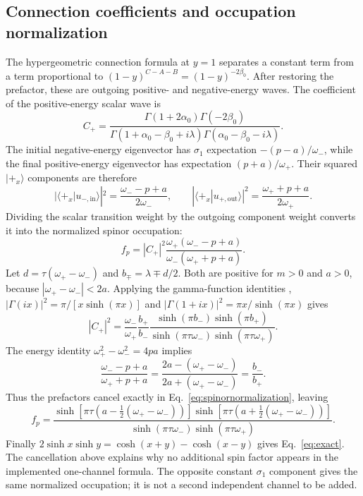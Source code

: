 \documentclass[11pt,a4paper]{article}
\begin{document}
\subsection{Connection coefficients and occupation normalization}
The hypergeometric connection formula \cite[Eq.~15.10.21]{DLMF} at $y=1$ separates a constant term from a term proportional to $(1-y)^{C-A-B}=(1-y)^{-2\beta_0}$. After restoring the prefactor, these are outgoing positive- and negative-energy waves. The coefficient of the positive-energy scalar wave is
\begin{equation}
 C_+=\frac{\Gamma(1+2\alpha_0)\Gamma(-2\beta_0)}
 {\Gamma(1+\alpha_0-\beta_0+i\lambda)\Gamma(\alpha_0-\beta_0-i\lambda)}.
 \label{eq:connection}
\end{equation}
The initial negative-energy eigenvector has $\sigma_1$ expectation $-(p-a)/\omega_-$, while the final positive-energy eigenvector has expectation $(p+a)/\omega_+$. Their squared $|+_x\rangle$ components are therefore
\begin{equation}
 |\langle+_x|u_{-,\mathrm{in}}\rangle|^2=\frac{\omega_--p+a}{2\omega_-},\qquad
 |\langle+_x|u_{+,\mathrm{out}}\rangle|^2=\frac{\omega_++p+a}{2\omega_+}.
\end{equation}
Dividing the scalar transition weight by the outgoing component weight converts it into the normalized spinor occupation:
\begin{equation}
 f_p=|C_+|^2\frac{\omega_+(\omega_--p+a)}{\omega_-(\omega_++p+a)}.
 \label{eq:spinornormalization}
\end{equation}
Let $d=\tau(\omega_+-\omega_-)$ and $b_\mp=\lambda\mp d/2$. Both are positive for $m>0$ and $a>0$, because $|\omega_+-\omega_-|<2a$. Applying the gamma-function identities \cite[Eqs.~5.4.3 and~5.5.1]{DLMF}, $|\Gamma(ix)|^2=\pi/[x\sinh(\pi x)]$ and $|\Gamma(1+ix)|^2=\pi x/\sinh(\pi x)$ gives
\begin{equation}
 |C_+|^2=\frac{\omega_-}{\omega_+}\frac{b_+}{b_-}
 \frac{\sinh(\pi b_-)\sinh(\pi b_+)}
 {\sinh(\pi\tau\omega_-)\sinh(\pi\tau\omega_+)}.
\end{equation}
The energy identity $\omega_+^2-\omega_-^2=4pa$ implies
\begin{equation}
 \frac{\omega_--p+a}{\omega_++p+a}
 =\frac{2a-(\omega_+-\omega_-)}{2a+(\omega_+-\omega_-)}
 =\frac{b_-}{b_+}.
\end{equation}
Thus the prefactors cancel exactly in Eq.~\eqref{eq:spinornormalization}, leaving
\begin{equation}
 f_p=\frac{\sinh[\pi\tau(a-\tfrac12(\omega_+-\omega_-))]
             \sinh[\pi\tau(a+\tfrac12(\omega_+-\omega_-))]}
 {\sinh(\pi\tau\omega_-)\sinh(\pi\tau\omega_+)}.
 \label{eq:sauterproduct}
\end{equation}
Finally $2\sinh x\sinh y=\cosh(x+y)-\cosh(x-y)$ gives Eq.~\eqref{eq:exact}. The cancellation above explains why no additional spin factor appears in the implemented one-channel formula. The opposite constant $\sigma_1$ component gives the same normalized occupation; it is not a second independent channel to be added.
\end{document}
